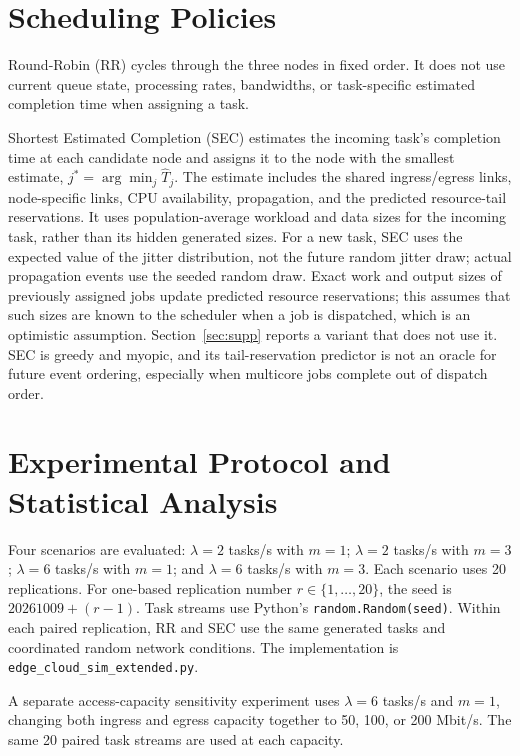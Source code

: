 \documentclass[conference]{IEEEtran}
\begin{document}
\section{Scheduling Policies}
Round-Robin (RR) cycles through the three nodes in fixed order. It does not use current queue state, processing rates, bandwidths, or task-specific estimated completion time when assigning a task.

Shortest Estimated Completion (SEC) estimates the incoming task's completion time at each candidate node and assigns it to the node with the smallest estimate, $j^*=\arg\min_j\hat{T}_j$. The estimate includes the shared ingress/egress links, node-specific links, CPU availability, propagation, and the predicted resource-tail reservations. It uses population-average workload and data sizes for the incoming task, rather than its hidden generated sizes. For a new task, SEC uses the expected value of the jitter distribution, not the future random jitter draw; actual propagation events use the seeded random draw. Exact work and output sizes of previously assigned jobs update predicted resource reservations; this assumes that such sizes are known to the scheduler when a job is dispatched, which is an optimistic assumption. Section~\ref{sec:supp} reports a variant that does not use it. SEC is greedy and myopic, and its tail-reservation predictor is not an oracle for future event ordering, especially when multicore jobs complete out of dispatch order.

\section{Experimental Protocol and Statistical Analysis}
Four scenarios are evaluated: $\lambda=2$ tasks/s with $m=1$; $\lambda=2$ tasks/s with $m=3$; $\lambda=6$ tasks/s with $m=1$; and $\lambda=6$ tasks/s with $m=3$. Each scenario uses 20 replications. For one-based replication number $r\in\{1,\ldots,20\}$, the seed is $20261009+(r-1)$. Task streams use Python's \texttt{random.Random(seed)}. Within each paired replication, RR and SEC use the same generated tasks and coordinated random network conditions. The implementation is \texttt{edge\_cloud\_sim\_extended.py}.

A separate access-capacity sensitivity experiment uses $\lambda=6$ tasks/s and $m=1$, changing both ingress and egress capacity together to 50, 100, or 200 Mbit/s. The same 20 paired task streams are used at each capacity.
\end{document}
